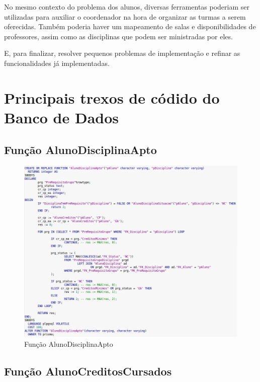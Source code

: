\documentclass[graduacao,brazil]{ThesisPUC}
\begin{document}
No mesmo contexto do problema dos alunos, diversas ferramentas poderiam ser utilizadas para auxiliar o coordenador na hora de organizar as turmas a serem oferecidas. Também poderia haver um mapeamento de salas e disponibilidades de professores, assim como as disciplinas que podem ser ministradas por eles.

E, para finalizar, resolver pequenos problemas de implementação e refinar as funcionalidades já implementadas.

\arial
\nocite{*}


\normalfont

\appendix

\chapter{Principais trexos de códido do Banco de Dados}

\section{Função AlunoDisciplinaApto}

\begin{figure}[H]
    \centering
    \includegraphics[width=\linewidth]{img/v3_func_alunoapto.png}
    \caption{Função AlunoDisciplinaApto}
\end{figure}

\section{Função AlunoCreditosCursados}
\end{document}
